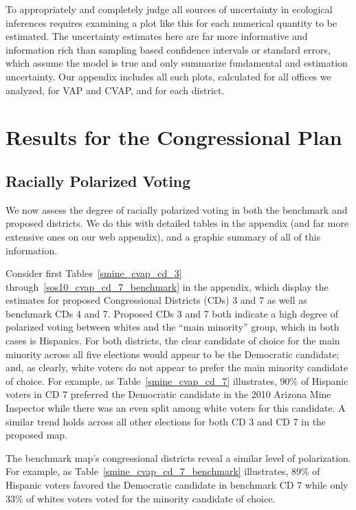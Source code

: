 \documentclass[12pt,draft]{scrartcl}
\begin{document}
To appropriately and completely judge all sources of uncertainty in
ecological inferences requires examining a plot like this for each
numerical quantity to be estimated.  The uncertainty estimates here
are far more informative and information rich than sampling based
confidence intervals or standard errors, which assume the model is
true and only summarize fundamental and estimation uncertainty.  Our
appendix includes all such plots, calculated for all offices we
analyzed, for VAP and CVAP, and for each district.

\section{Results for the Congressional Plan}\label{s:res}

\subsection{Racially Polarized Voting}

We now assess the degree of racially polarized voting in both the
benchmark and proposed districts.  We do this with detailed tables in
the appendix (and far more extensive ones on our web appendix), and a
graphic summary of all of this information.

Consider first Tables~\ref{smine_cvap_cd_3}
through~\ref{sos10_cvap_cd_7_benchmark} in the appendix, which display
the estimates for proposed Congressional Districts (CDs) 3 and 7 as
well as benchmark CDs 4 and 7. Proposed CDs 3 and 7 both indicate a
high degree of polarized voting between whites and the ``main
minority'' group, which in both cases is Hispanics. For both
districts, the clear candidate of choice for the main minority across
all five elections would appear to be the Democratic candidate; and,
as clearly, white voters do not appear to prefer the main minority
candidate of choice. For example, as Table~\ref{smine_cvap_cd_7}
illustrates, 90\% of Hispanic voters in CD 7 preferred the Democratic
candidate in the 2010 Arizona Mine Inspector while there was an even
split among white voters for this candidate. A similar trend holds
across all other elections for both CD 3 and CD 7 in the proposed map.

The benchmark map's congressional districts reveal a similar level of
polarization. For example, as Table~\ref{smine_cvap_cd_7_benchmark}
illustrates, 89\% of Hispanic voters favored the Democratic candidate
in benchmark CD 7 while only 33\% of whites voters voted for the
minority candidate of choice.
\end{document}
